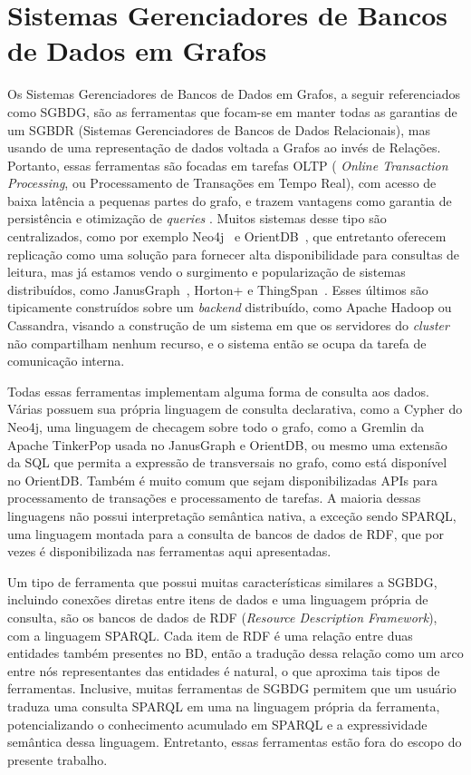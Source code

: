 \documentclass[conference]{IEEEtran}
\begin{document}
\section{Sistemas Gerenciadores de Bancos de Dados em Grafos}

Os Sistemas Gerenciadores de Bancos de Dados em Grafos, a seguir referenciados
como SGBDG, são as ferramentas que focam-se em manter todas as garantias de um
SGBDR (Sistemas Gerenciadores de Bancos de Dados Relacionais), mas usando de
uma representação de dados voltada a Grafos ao invés de
Relações. Portanto, essas ferramentas são focadas em tarefas OLTP (
\emph{Online Transaction Processing}, ou Processamento de Transações em Tempo
Real), com acesso
de baixa latência a pequenas partes do grafo, e trazem vantagens como garantia
de persistência e otimização de \emph{queries} \cite{nole-sartiani}. Muitos
sistemas desse tipo são centralizados, como por exemplo Neo4j~\cite{neo4j} e
OrientDB~\cite{orientdb}, que entretanto oferecem replicação como uma solução
para fornecer alta disponibilidade para consultas de leitura, mas já estamos
vendo o surgimento e popularização de sistemas distribuídos, como
JanusGraph~\cite{janusgraph}, Horton+ \cite{horton} e
ThingSpan~\cite{thingspan}. Esses últimos são tipicamente construídos sobre um
\emph{backend} distribuído, como Apache Hadoop ou Cassandra, visando a
construção de um sistema em que os servidores do \emph{cluster} não
compartilham nenhum recurso, e o sistema então se ocupa da tarefa de
comunicação interna.

Todas essas ferramentas implementam alguma forma de consulta aos dados. Várias
possuem sua própria linguagem de consulta declarativa, como a Cypher do Neo4j,
uma linguagem de checagem sobre todo o grafo, como a Gremlin da Apache
TinkerPop usada no JanusGraph e OrientDB, ou mesmo uma extensão da SQL que
permita a expressão de transversais no grafo, como está disponível no OrientDB.
Também é muito comum que sejam disponibilizadas APIs para processamento de
transações e processamento de tarefas. A maioria dessas linguagens não possui
interpretação semântica nativa, a exceção sendo SPARQL, uma linguagem montada
para a consulta de bancos de dados de RDF, que por vezes é disponibilizada nas
ferramentas aqui apresentadas.

Um tipo de ferramenta que possui muitas características similares a SGBDG,
incluindo conexões diretas entre itens de dados e uma linguagem própria de
consulta, são os bancos de dados de RDF (\emph{Resource Description Framework}),
com a linguagem SPARQL. Cada item de RDF é uma relação entre duas entidades
também presentes no BD, então a tradução dessa relação como um arco entre nós
representantes das entidades é natural, o que aproxima tais tipos de
ferramentas. Inclusive, muitas ferramentas de SGBDG permitem que um usuário
traduza uma consulta SPARQL em uma na linguagem própria da ferramenta,
potencializando o conhecimento acumulado em SPARQL e a expressividade
semântica dessa linguagem. Entretanto, essas ferramentas estão fora do escopo
do presente trabalho.
\end{document}
